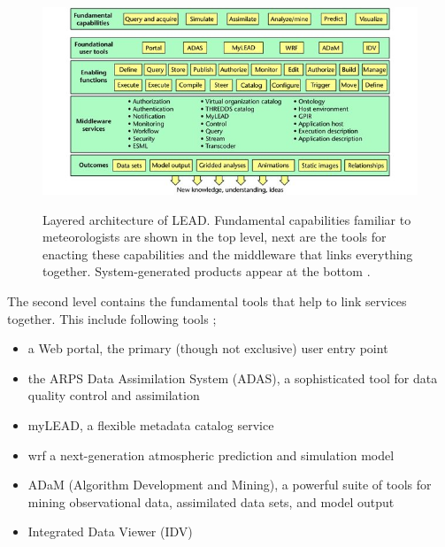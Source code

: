\begin{figure}[htp]
    \centering
    \includegraphics[width=1.0\textwidth]{lead/LEAD-system-Fundamental-capabilities-familiar-to-meteorologists-are-shown-in-the-top_W640.jpg}\\
    \caption{Layered architecture of LEAD. Fundamental capabilities familiar to meteorologists are shown in the top level, next are the tools for enacting these capabilities and the middleware that links everything together. System-generated products appear at the bottom \cite{Droegemeier2005Service-OrientedWeather}. }
    \label{fi:lead_system}
\end{figure}


The second level contains the fundamental tools that help to link services together. This include following tools \cite{Droegemeier2005Service-OrientedWeather};
\begin{itemize}
    \item a Web portal, the primary (though not exclusive) user entry point
    \item the ARPS Data Assimilation System (ADAS), a sophisticated tool for data quality control and assimilation
    \item myLEAD, a flexible metadata catalog service
    \item \acrfull{wrf} a next-generation atmospheric prediction and simulation model
    \item ADaM (Algorithm Development and Mining), a powerful suite of tools for mining observational data, assimilated data sets, and model output 
    \item Integrated Data Viewer (IDV) 
\end{itemize}

